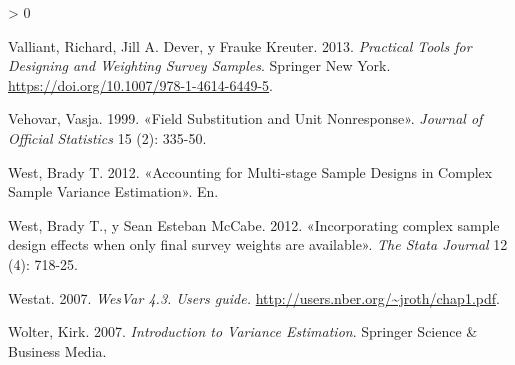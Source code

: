 \documentclass[
  12pt,
  spanish,
]{book}
\newlength{\cslhangindent}
\newenvironment{CSLReferences}[2] %
 {%
  \setlength{\parindent}{0pt}
  \ifodd #1 \everypar{\setlength{\hangindent}{\cslhangindent}}\ignorespaces\fi
  \ifnum #2 > 0
  \setlength{\parskip}{#2\baselineskip}
  \fi
 }%
 {}
\begin{document}
\begin{CSLReferences}{1}{0}
\leavevmode\hypertarget{ref-Valliant_Dever_Kreuter_2013}{}%
Valliant, Richard, Jill A. Dever, y Frauke Kreuter. 2013. \emph{Practical Tools for Designing and Weighting Survey Samples}. Springer New York. \url{https://doi.org/10.1007/978-1-4614-6449-5}.

\leavevmode\hypertarget{ref-Vehovar_1999}{}%
Vehovar, Vasja. 1999. {«Field Substitution and Unit Nonresponse»}. \emph{Journal of Official Statistics} 15 (2): 335-50.

\leavevmode\hypertarget{ref-West2012AccountingFM}{}%
West, Brady T. 2012. {«Accounting for Multi-stage Sample Designs in Complex Sample Variance Estimation»}. En.

\leavevmode\hypertarget{ref-West_McCabe_2012}{}%
West, Brady T., y Sean Esteban McCabe. 2012. {«Incorporating complex sample design effects when only final survey weights are available»}. \emph{The Stata Journal} 12 (4): 718-25.

\leavevmode\hypertarget{ref-Westat_2007}{}%
Westat. 2007. \emph{WesVar 4.3. Users guide.} \url{http://users.nber.org/~jroth/chap1.pdf}.

\leavevmode\hypertarget{ref-Wolter_2007}{}%
Wolter, Kirk. 2007. \emph{Introduction to Variance Estimation}. Springer Science \& Business Media.

\end{CSLReferences}
\end{document}
